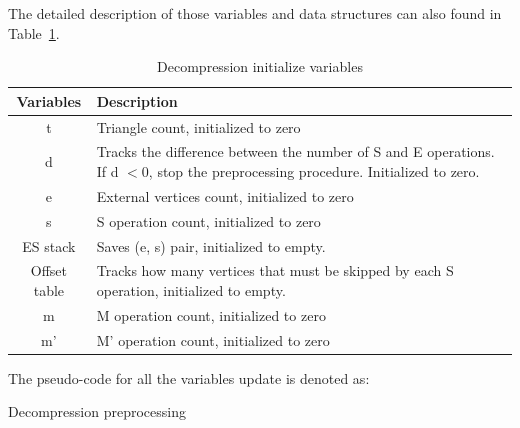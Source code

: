 \documentclass[onecolumn, 12pt]{article}
\begin{document}
The detailed description of those variables and data structures can also found in Table~\ref{tab:decompressInit}.
\begin{table}[h]
\normalsize
\centering
\caption{Decompression initialize variables}
  \begin{tabular}{ | c | p{} | }
    \hline
     Variables & Description \\
     \hline
     t & Triangle count, initialized to zero \\
     \hline
     d & Tracks the difference between the number of S and E operations. If d $< 0$, stop the preprocessing procedure. Initialized to zero.\\
     \hline
     e & External vertices count, initialized to zero \\
     \hline
     s & S operation count, initialized to zero \\
     \hline
     ES stack & Saves (e, s) pair, initialized to empty. \\
     \hline
     Offset table & Tracks how many vertices that must be skipped by each S operation, initialized to empty. \\
     \hline
     m & M operation count, initialized to zero \\
     \hline
     m' & M' operation count, initialized to zero \\
     \hline
    \hline
  \end{tabular}
  \label{tab:decompressInit}
\end{table}

The pseudo-code for all the variables update is denoted as:
\begin{algorithm}[H]
\caption{Decompression preprocessing}
\begin{algorithmic}[1]
    \ENDIF
\ENDIF
\end{algorithmic}
\end{algorithm}
\end{document}
